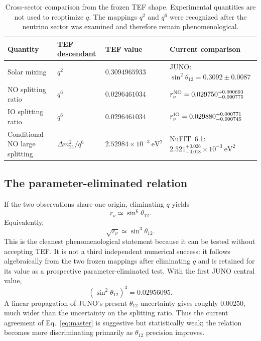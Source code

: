 \documentclass[10pt,twocolumn]{article}
\newcommand{\rnu}{r_{\nu}}
\begin{document}
\begin{table}[t]
\centering
\caption{Cross-sector comparison from the frozen TEF shape.  Experimental
quantities are not used to reoptimize $q$.  The mappings $q^2$ and $q^6$ were
recognized after the neutrino sector was examined and therefore remain
phenomenological.}
\label{tab:numerics}
\begin{tabular}{@{}p{3.5cm}p{3.4cm}p{3.2cm}p{4.2cm}@{}}
\toprule
Quantity & TEF descendant & TEF value & Current comparison\\
\midrule
Solar mixing
& $q^2$
& $0.3094965933$
& JUNO: $\sin^2\theta_{12}=0.3092\pm0.0087$\\[0.45em]
NO splitting ratio
& $q^6$
& $0.0296461034$
& $\rnu^{\rm NO}=0.029750^{+0.000693}_{-0.000775}$\\[0.45em]
IO splitting ratio
& $q^6$
& $0.0296461034$
& $\rnu^{\rm IO}=0.029880^{+0.000771}_{-0.000745}$\\[0.45em]
Conditional NO large splitting
& $\Delta m^2_{21}/q^6$
& $2.52984\times10^{-3}\ \mathrm{eV}^2$
& NuFIT~6.1: $2.521^{+0.026}_{-0.018}\times10^{-3}\ \mathrm{eV}^2$\\
\bottomrule
\end{tabular}
\end{table}

\subsection{The parameter-eliminated relation}

If the two observations share one origin, eliminating $q$ yields
\begin{equation}
\boxed{
\rnu
\simeq
\sin^6\theta_{12}.
}
\label{eq:master}
\end{equation}
Equivalently,
\begin{equation}
\sqrt{\rnu}
\simeq
\sin^3\theta_{12}.
\label{eq:masterroot}
\end{equation}
This is the cleanest phenomenological statement because it can be tested without
accepting TEF.  It is not a third independent numerical success: it follows
algebraically from the two frozen mappings after eliminating $q$ and is retained
for its value as a prospective parameter-eliminated test.  With the first JUNO central value,
\begin{equation}
(\sin^2\theta_{12})^3
=0.02956095.
\end{equation}
A linear propagation of JUNO's present $\theta_{12}$ uncertainty gives roughly
$0.00250$, much wider than the uncertainty on the splitting ratio.  Thus the
current agreement of Eq.~\eqref{eq:master} is suggestive but statistically weak;
the relation becomes more discriminating primarily as $\theta_{12}$ precision
improves.
\end{document}
